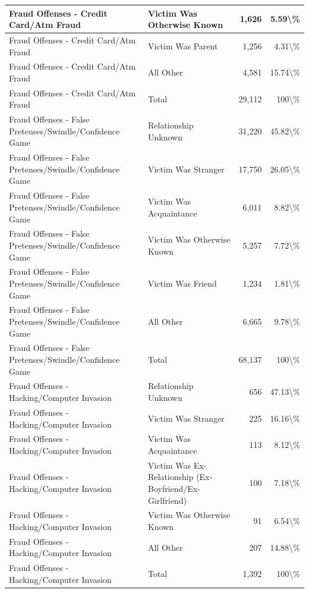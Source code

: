 \documentclass[
]{krantz}
\begin{document}
\begin{longtable}[t]{l|l|r|r}
\hline
Fraud Offenses - Credit Card/Atm Fraud & Victim Was Otherwise Known & 1,626 & 5.59\textbackslash{}\%\\
\hline
Fraud Offenses - Credit Card/Atm Fraud & Victim Was Parent & 1,256 & 4.31\textbackslash{}\%\\
\hline
Fraud Offenses - Credit Card/Atm Fraud & All Other & 4,581 & 15.74\textbackslash{}\%\\
\hline
Fraud Offenses - Credit Card/Atm Fraud & Total & 29,112 & 100\textbackslash{}\%\\
\hline
Fraud Offenses - False Pretenses/Swindle/Confidence Game & Relationship Unknown & 31,220 & 45.82\textbackslash{}\%\\
\hline
Fraud Offenses - False Pretenses/Swindle/Confidence Game & Victim Was Stranger & 17,750 & 26.05\textbackslash{}\%\\
\hline
Fraud Offenses - False Pretenses/Swindle/Confidence Game & Victim Was Acquaintance & 6,011 & 8.82\textbackslash{}\%\\
\hline
Fraud Offenses - False Pretenses/Swindle/Confidence Game & Victim Was Otherwise Known & 5,257 & 7.72\textbackslash{}\%\\
\hline
Fraud Offenses - False Pretenses/Swindle/Confidence Game & Victim Was Friend & 1,234 & 1.81\textbackslash{}\%\\
\hline
Fraud Offenses - False Pretenses/Swindle/Confidence Game & All Other & 6,665 & 9.78\textbackslash{}\%\\
\hline
Fraud Offenses - False Pretenses/Swindle/Confidence Game & Total & 68,137 & 100\textbackslash{}\%\\
\hline
Fraud Offenses - Hacking/Computer Invasion & Relationship Unknown & 656 & 47.13\textbackslash{}\%\\
\hline
Fraud Offenses - Hacking/Computer Invasion & Victim Was Stranger & 225 & 16.16\textbackslash{}\%\\
\hline
Fraud Offenses - Hacking/Computer Invasion & Victim Was Acquaintance & 113 & 8.12\textbackslash{}\%\\
\hline
Fraud Offenses - Hacking/Computer Invasion & Victim Was Ex-Relationship (Ex-Boyfriend/Ex-Girlfriend) & 100 & 7.18\textbackslash{}\%\\
\hline
Fraud Offenses - Hacking/Computer Invasion & Victim Was Otherwise Known & 91 & 6.54\textbackslash{}\%\\
\hline
Fraud Offenses - Hacking/Computer Invasion & All Other & 207 & 14.88\textbackslash{}\%\\
\hline
Fraud Offenses - Hacking/Computer Invasion & Total & 1,392 & 100\textbackslash{}\%\\

\end{longtable}
\end{document}
